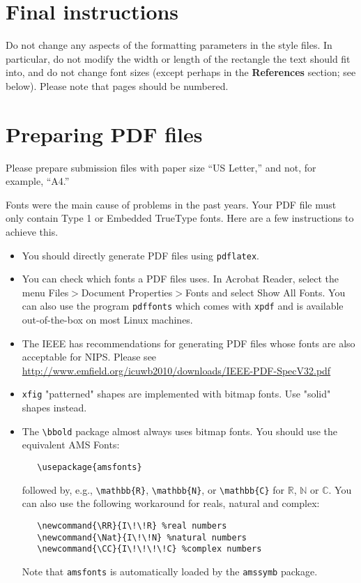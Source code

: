 \documentclass[final]{article}
\begin{document}
\begin{itemize}
\section{Final instructions}

Do not change any aspects of the formatting parameters in the style
files.  In particular, do not modify the width or length of the
rectangle the text should fit into, and do not change font sizes
(except perhaps in the \textbf{References} section; see below). Please
note that pages should be numbered.

\section{Preparing PDF files}

Please prepare submission files with paper size ``US Letter,'' and
not, for example, ``A4.''

Fonts were the main cause of problems in the past years. Your PDF file
must only contain Type 1 or Embedded TrueType fonts. Here are a few
instructions to achieve this.

\begin{itemize}

\item You should directly generate PDF files using \verb+pdflatex+.

\item You can check which fonts a PDF files uses.  In Acrobat Reader,
  select the menu Files$>$Document Properties$>$Fonts and select Show
  All Fonts. You can also use the program \verb+pdffonts+ which comes
  with \verb+xpdf+ and is available out-of-the-box on most Linux
  machines.

\item The IEEE has recommendations for generating PDF files whose
  fonts are also acceptable for NIPS. Please see
  \url{http://www.emfield.org/icuwb2010/downloads/IEEE-PDF-SpecV32.pdf}

\item \verb+xfig+ "patterned" shapes are implemented with bitmap
  fonts.  Use "solid" shapes instead.

\item The \verb+\bbold+ package almost always uses bitmap fonts.  You
  should use the equivalent AMS Fonts:
\begin{verbatim}
   \usepackage{amsfonts}
\end{verbatim}
followed by, e.g., \verb+\mathbb{R}+, \verb+\mathbb{N}+, or
\verb+\mathbb{C}+ for $\mathbb{R}$, $\mathbb{N}$ or $\mathbb{C}$.  You
can also use the following workaround for reals, natural and complex:
\begin{verbatim}
   \newcommand{\RR}{I\!\!R} %real numbers
   \newcommand{\Nat}{I\!\!N} %natural numbers
   \newcommand{\CC}{I\!\!\!\!C} %complex numbers
\end{verbatim}
Note that \verb+amsfonts+ is automatically loaded by the
\verb+amssymb+ package.


\end{itemize}
\end{itemize}
\end{document}

